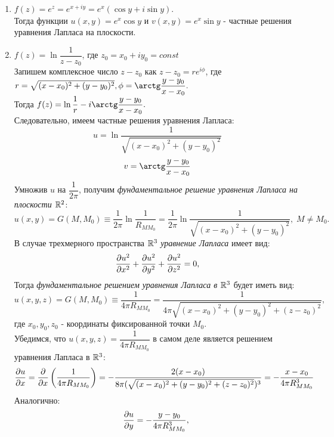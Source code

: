 \documentclass[../main.tex]{subfiles}
\begin{document}
    \begin{enumerate}
        \item $f(z) = e^z = e^{x+iy} = e^x(\cos{y}+i\sin{y})$.\\ Тогда функции $u(x,y) = e^x\cos{y}$ и $v(x,y) = e^x\sin{y}$ - частные решения уравнения Лапласа на плоскости.
        \item $f(z) = \ln{\dfrac{1}{z-z_0}}$, где $z_0 = x_0 + iy_0 = const$\\
        Запишем комплексное число $z-z_0$ как $z-z_0=re^{i\phi}$, где $r = \sqrt{(x-x_0)^2 + (y - y_0)^2},\\\phi = \arctg\dfrac{y-y_0}{x-x_0}.$\\
        Тогда $f(z) = \ln{\dfrac{1}{r}} - i\arctg\dfrac{y-y_0}{x-x_0}.$\\
        Следовательно, имеем частные решения уравнения Лапласа:
        \[
            u = \ln{\dfrac{1}{\sqrt{(x-x_0)^2 + (y - y_0)^2}}}
        \]
        \[
            v = \arctg\dfrac{y-y_0}{x-x_0}
        \]
        Умножив $u$ на $\dfrac{1}{2\pi}$, получим \textit{фундаментальное решение уравнения Лапласа на плоскости $\mathbb{R}^2$}:
        \begin{equation}
            u(x, y) = G(M, M_0) \equiv \dfrac{1}{2\pi}\ln{\dfrac{1}{R_{MM_0}}} =  \dfrac{1}{2\pi}\ln{\dfrac{1}{\sqrt{(x-x_0)^2 + (y - y_0)^2}}},\; M \ne M_0.
        \end{equation}
        В случае трехмерного пространства $\mathbb{R}^3$ \textit{уравнение Лапласа} имеет вид:
        \begin{equation}
            \pderivTwo{u}{x}{x} + \pderivTwo{u}{y}{y} + \pderivTwo{u}{z}{z} = 0,
        \end{equation}
        Тогда \textit{фундаментальное решением уравнения Лапласа в $\mathbb{R}^3$} будет иметь вид:
        \begin{equation}
            u(x, y, z) = G(M, M_0) \equiv \dfrac{1}{4\pi R_{MM_0}} =  \dfrac{1}{4\pi{\sqrt{(x-x_0)^2 + (y - y_0)^2 + (z - z_0)^2}}},
        \end{equation}
        где $x_0, y_0, z_0$ - координаты фиксированной точки $M_0$.\\
        Убедимся, что $u(x, y, z) = \dfrac{1}{4\pi R_{MM_0}}$ в самом деле является решением уравнения Лапласа в $\mathbb{R}^3$:
        \[
            \frac{\partial u}{\partial x} = \frac{\partial}{\partial x}\left(\dfrac{1}{4\pi R_{MM_0}}\right) =  - \dfrac{2(x-x_0)}{{8\pi(\sqrt{(x-x_0)^2 + (y - y_0)^2 + (z - z_0)^2}})^3} = - \dfrac{x-x_0}{4\pi R_{MM_0}^3}
        \]
        Аналогично:
        \[
            \frac{\partial u}{\partial y} = - \dfrac{y-y_0}{4\pi R_{MM_0}^3},\;
\]
\end{enumerate}
\end{document}
